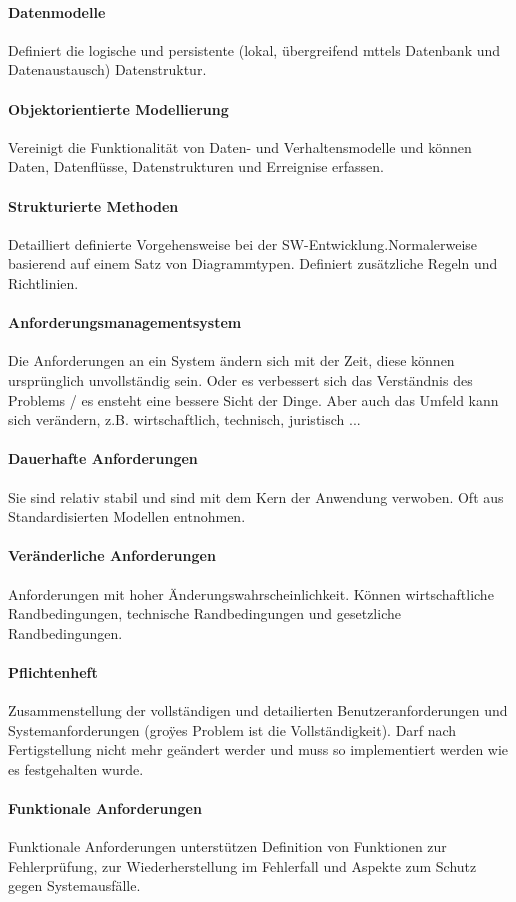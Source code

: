 \paragraph{Datenmodelle}
Definiert die logische und persistente (lokal, übergreifend mttels Datenbank
und Datenaustausch) Datenstruktur.
\paragraph{Objektorientierte Modellierung}
Vereinigt die Funktionalität von Daten- und Verhaltensmodelle und können Daten, Datenflüsse, Datenstrukturen und Erreignise erfassen.
\paragraph{Strukturierte Methoden}
Detailliert definierte Vorgehensweise bei der SW-Entwicklung.Normalerweise basierend auf einem Satz von Diagrammtypen. Definiert zusätzliche Regeln
und Richtlinien.
\paragraph{Anforderungsmanagementsystem}
Die Anforderungen an ein System ändern sich mit der Zeit, diese können ursprünglich unvollständig sein. Oder es verbessert sich das Verständnis des Problems / es ensteht eine bessere Sicht der Dinge. Aber auch das Umfeld kann sich verändern, z.B. wirtschaftlich, technisch, juristisch ...
\paragraph{Dauerhafte Anforderungen}
Sie sind relativ stabil und sind mit dem Kern der Anwendung verwoben. Oft aus Standardisierten Modellen entnohmen.
\paragraph{Veränderliche Anforderungen}
Anforderungen mit hoher Änderungswahrscheinlichkeit. Können wirtschaftliche Randbedingungen, technische Randbedingungen und gesetzliche Randbedingungen.
\paragraph{Pflichtenheft}
Zusammenstellung der vollständigen und detailierten Benutzeranforderungen und Systemanforderungen (groÿes Problem ist die Vollständigkeit). Darf nach Fertigstellung nicht mehr geändert werder und muss so implementiert werden wie es festgehalten wurde.
\paragraph{Funktionale Anforderungen}
Funktionale Anforderungen unterstützen Definition von Funktionen zur Fehlerprüfung, zur Wiederherstellung im Fehlerfall und Aspekte zum Schutz gegen Systemausfälle.
